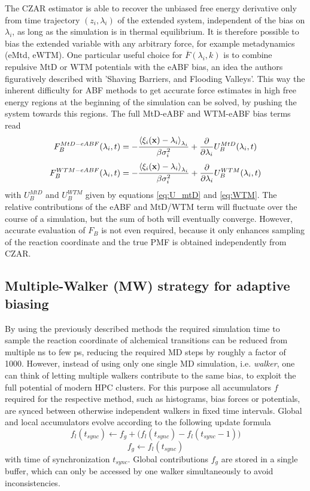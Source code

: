 The CZAR estimator is able to recover the unbiased free energy derivative only from time trajectory $(z_i,\lambda_i)$ of the extended system, independent of the bias on $\lambda_i$, as long as the simulation is in thermal equilibrium. It is therefore possible to bias the extended variable with any arbitrary force, for example metadynamics (eMtd, eWTM).
One particular useful choice for $\overline{F}(\lambda_{i}, k)$ is to combine repulsive MtD or WTM potentials with the eABF bias, an idea the authors figuratively described with 'Shaving Barriers, and Flooding Valleys'.\autocite{fu2018zooming}
This way the inherent difficulty for ABF methods to get accurate force estimates in high free energy regions at the beginning of the simulation can be solved, by pushing the system towards this regions.
The full MtD-eABF and WTM-eABF bias terms read
\begin{equation}
  F_{B}^{MtD-eABF}(\lambda_i, t) = -\frac{\braket{\xi_i(\textbf{x})-\lambda_i}_{\lambda_i}}{\beta \sigma_i^2}+\frac{\partial}{\partial \lambda_i} U_{B}^{MtD}(\lambda_i,t)
\end{equation}
\begin{equation}
  F_{B}^{WTM-eABF}(\lambda_i, t) = -\frac{\braket{\xi_i(\textbf{x})-\lambda_i}_{\lambda_i}}{\beta \sigma_i^2}+\frac{\partial}{\partial \lambda_i} U_{B}^{WTM}(\lambda_i,t)
\end{equation}
with $U_{B}^{MtD}$ and $U_{B}^{WTM}$ given by equations \ref{eq:U_mtD} and \ref{eq:WTM}.
The relative contributions of the eABF and MtD/WTM term will fluctuate over the course of a simulation, but the sum of both will eventually converge. However, accurate evaluation of $F_B$ is not even required, because it only enhances sampling of the reaction coordinate and the true PMF is obtained independently from CZAR.

\subsection{Multiple-Walker (MW) strategy for adaptive biasing}
\label{sec:MW}
By using the previously described methods the required simulation time to sample the reaction coordinate of alchemical transitions can be reduced from multiple ns to few ps, reducing the required MD steps by roughly a factor of 1000.
However, instead of using only one single MD simulation, i.e. \textit{walker}, one can think of letting multiple walkers contribute to the same bias, to exploit the full potential of modern HPC clusters.
For this purpose all accumulators $f$ required for the respective method, such as histograms, bias forces or potentials, are synced between otherwise independent walkers in fixed time intervals. Global and local accumulators evolve according to the following update formula
\begin{equation}
   f_{l}(t_{sync}) \leftarrow f_{g} + \biggl(f_{l}(t_{sync})-f_{l}(t_{sync}-1) \biggr)
\end{equation}
\begin{equation}
   f_{g} \leftarrow f_{l}(t_{sync})
\end{equation}
with time of synchronization $t_{sync}$.
Global contributions $f_{g}$ are stored in a single buffer, which can only be accessed by one walker simultaneously to avoid inconsistencies.


